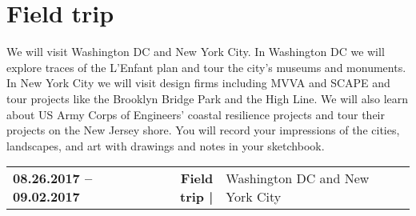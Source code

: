 \documentclass[11pt,article,oneside]{memoir}
\begin{document}
%

\section{Field trip}

We will visit Washington DC and New York City. 
In Washington DC we will explore traces of the L'Enfant plan
and tour the city's museums and monuments.
In New York City we will visit design firms including 
MVVA and SCAPE 
and tour projects like the Brooklyn Bridge Park and the High Line.
We will also learn about 
US Army Corps of Engineers' coastal resilience projects
and tour their projects on the New Jersey shore.
You will record your impressions of the cities, landscapes, and art
with drawings and notes in your sketchbook.

\begin{table}[H]
\small
\begin{tabular}{l r @{\hskip 0.1cm} l @{\hskip 0.5cm} l}
%
\textbf{08.26.2017 -- 09.02.2017} & \textbf{Field trip |} & Washington DC and New York City\\
%
\end{tabular}
\end{table}

\end{document}
